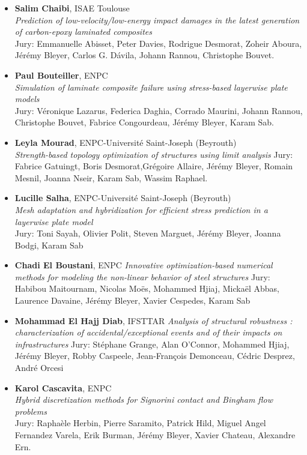 \begin{itemize}[noitemsep]
\item[2022] \textbf{Salim Chaibi}, ISAE Toulouse\\
\textit{Prediction of low-velocity/low-energy impact damages in the latest generation of carbon-epoxy laminated composites}\\
Jury: Emmanuelle Abisset, Peter Davies, Rodrigue Desmorat, Zoheir Aboura, Jérémy Bleyer, Carlos G. Dávila, Johann Rannou, Christophe Bouvet. 

\item[2022] \textbf{Paul Bouteiller}, ENPC\\
\textit{
Simulation of laminate composite failure using stress-based layerwise plate models}\\
Jury: Véronique Lazarus, Federica Daghia, Corrado Maurini, Johann Rannou, Christophe Bouvet, Fabrice Congourdeau, Jérémy Bleyer, Karam Sab.

\item[2021] \textbf{Leyla Mourad}, ENPC-Université Saint-Joseph (Beyrouth)\\
\textit{Strength-based topology optimization of structures using limit analysis}
Jury: Fabrice Gatuingt,  Boris Desmorat,Grégoire Allaire, Jérémy Bleyer, Romain Mesnil, Joanna Nseir, Karam Sab, Wassim Raphael. 

\item[2021] \textbf{Lucille Salha}, ENPC-Université Saint-Joseph (Beyrouth)\\
\textit{Mesh adaptation and hybridization for efficient stress prediction in a layerwise plate model}\\
Jury: Toni Sayah, Olivier Polit, Steven Marguet, Jérémy Bleyer, Joanna Bodgi, Karam Sab

\item[2020] \textbf{Chadi El Boustani}, ENPC
\textit{Innovative optimization-based numerical methods for modeling the non-linear behavior of steel structures}
Jury: Habibou Maitournam, Nicolas Moës, Mohammed Hjiaj, Mickaël Abbas, Laurence Davaine, Jérémy Bleyer, Xavier Cespedes, Karam Sab

\item[2019] \textbf{Mohammad El Hajj Diab}, IFSTTAR
\textit{Analysis of structural robustness : characterization of accidental/exceptional events and of their impacts on infrastructures}
Jury: Stéphane Grange, Alan O'Connor, Mohammed Hjiaj, Jérémy Bleyer, Robby Caspeele, Jean-François Demonceau, Cédric Desprez, André Orcesi

\item[2018] \textbf{Karol Cascavita}, ENPC\\
\textit{Hybrid discretization methods for Signorini contact and Bingham flow problems}\\
Jury: Raphaèle Herbin, Pierre Saramito, Patrick Hild, Miguel Angel Fernandez Varela, Erik Burman, Jérémy Bleyer, Xavier Chateau, Alexandre Ern.


\end{itemize}
